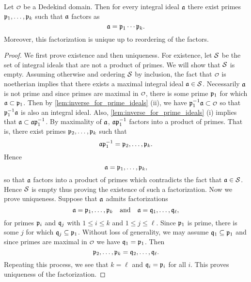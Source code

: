     \begin{theorem}\label{thm:unique_product_prime_ideals}
      Let $\smc{O}$ be a Dedekind domain. Then for every integral ideal $\mathfrak{a}$ there exist primes $\mathfrak{p}_{1},\ldots,\mathfrak{p}_{k}$ such that $\mathfrak{a}$ factors as
      \[
        \mathfrak{a} = \mathfrak{p}_{1} \cdots \mathfrak{p}_{k}.
      \]
      Moreover, this factorization is unique up to reordering of the factors.
    \end{theorem}
    \begin{proof}
      We first prove existence and then uniqueness. For existence, let $\mathcal{S}$ be the set of integral ideals that are not a product of primes. We will show that $\mathcal{S}$ is empty. Assuming otherwise and ordering $\mathcal{S}$ by inclusion, the fact that $\smc{O}$ is noetherian implies that there exists a maximal integral ideal $\mathfrak{a} \in \mathcal{S}$. Necessarily $\mathfrak{a}$ is not prime and since primes are maximal in $\smc{O}$, there is some prime $\mathfrak{p}_{1}$ for which $\mathfrak{a} \subset \mathfrak{p}_{1}$. Then by \cref{lem:inverse_for_prime_ideals} (ii), we have $\mf{p}_{1}^{-1}\mf{a} \subset \smc{O}$ so that $\mathfrak{p}_{1}^{-1}\mathfrak{a}$ is also an integral ideal. Also, \cref{lem:inverse_for_prime_ideals} (i) implies that $\mathfrak{a} \subset \mathfrak{a}\mathfrak{p}_{1}^{-1}$. By maximality of $\mathfrak{a}$, $\mathfrak{a}\mathfrak{p}_{1}^{-1}$ factors into a product of primes. That is, there exist primes $\mathfrak{p}_{2},\ldots,\mathfrak{p}_{k}$ such that
      \[
        \mathfrak{a}\mathfrak{p}_{1}^{-1} = \mathfrak{p}_{2},\ldots,\mathfrak{p}_{k}.
      \]
      Hence
      \[
        \mathfrak{a} = \mathfrak{p}_{1},\ldots,\mathfrak{p}_{k},
      \]
      so that $\mathfrak{a}$ factors into a product of primes which contradicts the fact that $\mathfrak{a} \in \mathcal{S}$. Hence $\mathcal{S}$ is empty thus proving the existence of such a factorization. Now we prove uniqueness. Suppose that $\mathfrak{a}$ admits factorizations
      \[
        \mathfrak{a} = \mathfrak{p}_{1},\ldots,\mathfrak{p}_{k} \quad \text{and} \quad \mathfrak{a} = \mathfrak{q}_{1},\ldots,\mathfrak{q}_{\ell},
      \]
      for primes $\mathfrak{p}_{i}$ and $\mathfrak{q}_{j}$ with $1 \le i \le k$ and $1 \le j \le \ell$. Since $\mathfrak{p}_{1}$ is prime, there is some $j$ for which $\mathfrak{q}_{j} \subseteq \mathfrak{p}_{1}$. Without loss of generality, we may assume $\mathfrak{q}_{1} \subseteq \mathfrak{p}_{1}$ and since primes are maximal in $\smc{O}$ we have $\mathfrak{q}_{1} = \mathfrak{p}_{1}$. Then
      \[
        \mathfrak{p}_{2},\ldots,\mathfrak{p}_{k} = \mathfrak{q}_{2},\ldots,\mathfrak{q}_{\ell}.
      \]
      Repeating this process, we see that $k = \ell$ and $\mathfrak{q}_{i} = \mathfrak{p}_{i}$ for all $i$. This proves uniqueness of the factorization.
    \end{proof}

